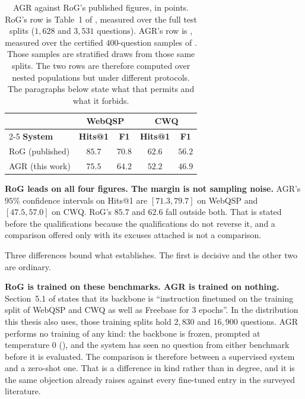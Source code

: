 \begin{table}[!tb]
  \begin{center}
    \caption[AGR against RoG's published figures]{AGR against RoG's
    published figures, in points. RoG's row is Table~1 of
    \cite{luo2024reasoning}, measured over the full test splits
    ($1{,}628$ and $3{,}531$ questions). AGR's row is ,
    measured over the certified $400$-question samples of
    . Those samples are stratified draws from those same
    splits. The two rows are therefore computed over nested populations
    but under different protocols. The paragraphs below state what that
    permits and what it forbids.}
    \label{tab:rog}
    \small
    \begin{tabular}{|l|c|c|c|c|}
      \hline
      & \multicolumn{2}{c|}{\textbf{WebQSP}}
      & \multicolumn{2}{c|}{\textbf{CWQ}} \\
      \cline{2-5}
      \textbf{System} & \textbf{Hits@1} & \textbf{F1}
                      & \textbf{Hits@1} & \textbf{F1} \\
      \hline
      RoG (published)  & $85.7$ & $70.8$ & $62.6$ & $56.2$ \\
      \hline
      AGR (this work)  & $75.5$ & $64.2$ & $52.2$ & $46.9$ \\
      \hline
    \end{tabular}
  \end{center}
\end{table}

\textbf{RoG leads on all four figures. The margin is not sampling
noise.} AGR's $95\%$ confidence intervals on Hits@1 are $[71.3, 79.7]$ on
WebQSP and $[47.5, 57.0]$ on CWQ. RoG's $85.7$ and $62.6$ fall outside
both. That is stated before the qualifications because the qualifications
do not reverse it, and a comparison offered only with its excuses attached
is not a comparison.

Three differences bound what  establishes. The first is
decisive and the other two are ordinary.

\textbf{RoG is trained on these benchmarks. AGR is trained on nothing.}
Section~5.1 of \cite{luo2024reasoning} states that its backbone is
``instruction finetuned on the training split of WebQSP and CWQ as well as
Freebase for 3 epochs''. In the distribution this thesis also uses, those
training splits hold $2{,}830$ and $16{,}900$ questions. AGR performs no
training of any kind: the backbone is frozen, prompted at temperature $0$
(), and the system has seen no question from either
benchmark before it is evaluated. The comparison is therefore between a
supervised system and a zero-shot one. That is a difference in kind rather
than in degree, and it is the same objection  already
raises against every fine-tuned entry in the surveyed literature.

